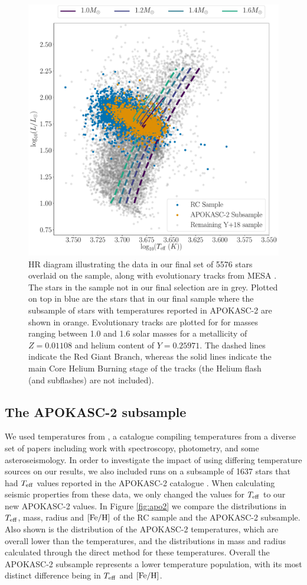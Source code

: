 \documentclass[fleqn,usenatbib]{mnras}
\newcommand{\nstars}{5576 \xspace} %
\newcommand{\teff}{\mbox{$T_{\rm eff}$}\xspace}
\newcommand{\feh}{\mbox{$\rm{[Fe/H]}$}\xspace}
\newcommand{\new}[1]{#1}
\begin{document}
\begin{figure}
\centering
\includegraphics[width=.49\textwidth]{data.pdf}
\caption{HR diagram illustrating the data in our final set of \nstars stars overlaid on the \protect{} sample, along with evolutionary tracks from MESA \protect\citep{art:paxton+2011,art:paxton+2013,art:paxton+2015}\citep[for details about the physical inputs of the models see][]{art:khan+2018}. The stars in the \protect{} sample not in our final selection are in grey. Plotted on top in blue are the stars that in our final sample where the subsample of stars with temperatures reported in APOKASC-2 \protect\citep{art:pinsonneault+2018} are shown in orange. Evolutionary tracks are plotted for for masses ranging between 1.0 and 1.6 solar masses for a metallicity of $Z = 0.01108$ and helium content of $Y = 0.25971$. The dashed lines indicate the Red Giant Branch, whereas the solid lines indicate the main Core Helium Burning stage  of the tracks (the Helium flash (and subflashes) are not included).}
\label{fig:datafig}
\end{figure}

\subsection{The APOKASC-2 subsample}
\new{We used temperatures from \cite{art:mathur+2017}, a catalogue compiling temperatures from a diverse set of papers including work with spectroscopy, photometry, and some asteroseismology. In order to investigate the impact of using differing temperature sources on our results, we also included runs on a subsample of 1637 stars that had \teff values reported in the APOKASC-2 catalogue \citep{art:pinsonneault+2014,art:pinsonneault+2018}. When calculating seismic properties from these data, we only changed the values for \teff to our new APOKASC-2 values. In Figure \ref{fig:apo2} we compare the distributions in \teff, mass, radius and \feh of the \citetalias{art:yu+2018} RC sample and the APOKASC-2 subsample. Also shown is the distribution of the APOKASC-2 temperatures, which are overall lower than the \citetalias{art:yu+2018} temperatures, and the distributions in mass and radius calculated through the direct method for these temperatures. Overall the APOKASC-2 subsample represents a lower temperature population, with its most distinct difference being in \teff and \feh.}
\end{document}
